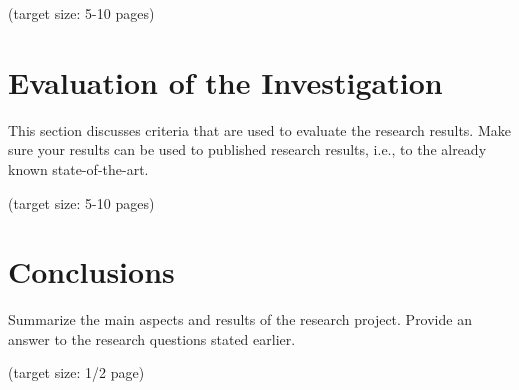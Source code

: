 \documentclass[a4paper,11pt,oneside]{article}
\begin{document}
  (target size: 5-10 pages)
  
  \section{Evaluation of the Investigation}
  \label{sec:4}

  This section discusses criteria that are used to evaluate the
  research results. Make sure your results can be used to published
  research results, i.e., to the already known state-of-the-art.

  (target size: 5-10 pages)


\section{Conclusions}
\label{sec:5}

  Summarize the main aspects and results of the research
  project. Provide an answer to the research questions stated earlier.

  (target size: 1/2 page)
  
  \newpage
  
  \printbibliography
  
\end{document}

